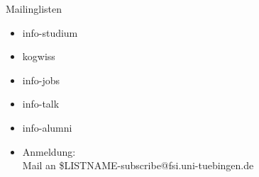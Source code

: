 \documentclass{beamer}
\begin{document}




	\begin{frame}[<+->]{Mailinglisten}
		\begin{itemize}
			\item info-studium
			\item kogwiss
			\item info-jobs
			\item info-talk
			\item info-alumni
			\item Anmeldung:\\
				Mail an \$LISTNAME-subscribe@fsi.uni-tuebingen.de 
		\end{itemize}
	\end{frame}
\end{document}
